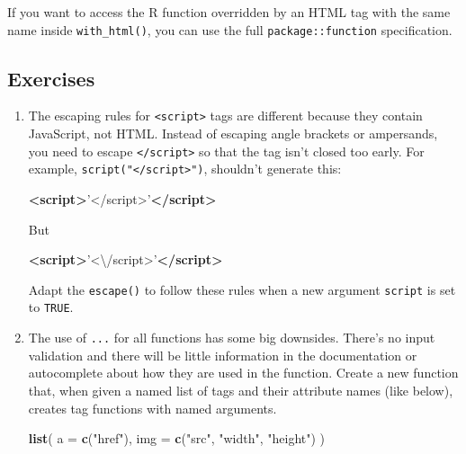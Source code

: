 \documentclass[]{book}
\newenvironment{Shaded}{\begin{snugshade}}{\end{snugshade}}
\newcommand{\DataTypeTok}[1]{\textcolor[rgb]{0.27,0.27,0.27}{#1}}
\newcommand{\KeywordTok}[1]{\textcolor[rgb]{0.27,0.27,0.27}{\textbf{#1}}}
\newcommand{\NormalTok}[1]{#1}
\newcommand{\StringTok}[1]{\textcolor[rgb]{0.5,0.5,0.5}{#1}}
\begin{document}
If you want to access the R function overridden by an HTML tag with the same name inside \texttt{with\_html()}, you can use the full \texttt{package::function} specification.

\hypertarget{exercises-14}{%
\subsection{Exercises}\label{exercises-14}}

\begin{enumerate}
\def\labelenumi{\arabic{enumi}.}
\item
  The escaping rules for \texttt{\textless{}script\textgreater{}} tags are different because they contain
  JavaScript, not HTML. Instead of escaping angle brackets or ampersands,
  you need to escape \texttt{\textless{}/script\textgreater{}} so that the tag isn't closed too early.
  For example, \texttt{script("\textquotesingle{}\textless{}/script\textgreater{}\textquotesingle{}")}, shouldn't generate this:

\begin{Shaded}
\begin{Highlighting}[]
\KeywordTok{<script>}\StringTok{'</script>'}\KeywordTok{</script>}
\end{Highlighting}
\end{Shaded}

  But

\begin{Shaded}
\begin{Highlighting}[]
\KeywordTok{<script>}\StringTok{'<\textbackslash{}/script>'}\KeywordTok{</script>}
\end{Highlighting}
\end{Shaded}

  Adapt the \texttt{escape()} to follow these rules when a new argument \texttt{script}
  is set to \texttt{TRUE}.
\item
  The use of \texttt{...} for all functions has some big downsides. There's no
  input validation and there will be little information in the
  documentation or autocomplete about how they are used in the function.
  Create a new function that, when given a named list of tags and their
  attribute names (like below), creates tag functions with named arguments.

\begin{Shaded}
\begin{Highlighting}[]
\KeywordTok{list}\NormalTok{(}
  \DataTypeTok{a =} \KeywordTok{c}\NormalTok{(}\StringTok{"href"}\NormalTok{),}
  \DataTypeTok{img =} \KeywordTok{c}\NormalTok{(}\StringTok{"src"}\NormalTok{, }\StringTok{"width"}\NormalTok{, }\StringTok{"height"}\NormalTok{)}
\NormalTok{)}
\end{Highlighting}
\end{Shaded}


\end{enumerate}
\end{document}
